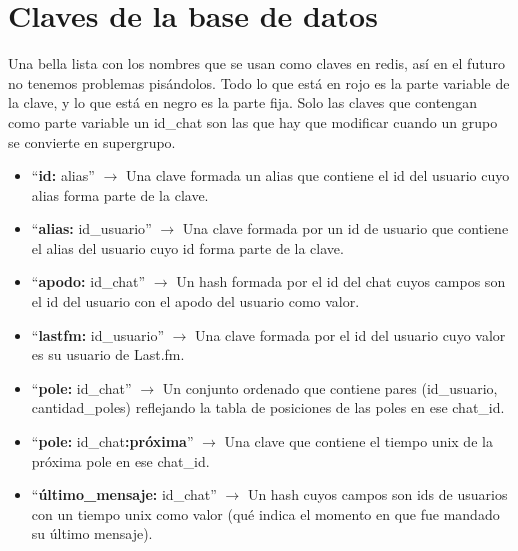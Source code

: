 \section{Claves de la base de datos}

Una bella lista con los nombres que se usan como claves en redis, así en el futuro no tenemos problemas pisándolos. Todo lo que está en rojo es la parte variable de la clave, y lo que está en negro es la parte fija. Solo las claves que contengan como parte variable un id\_chat son las que hay que modificar cuando un grupo se convierte en supergrupo.

\begin{itemize}
	\item ``\textbf{id:}{\color{red} alias}'' $\rightarrow$ Una clave formada un alias que contiene el id del usuario cuyo alias forma parte de la clave.
	\item ``\textbf{alias:}{\color{red} id\_usuario}'' $\rightarrow$ Una clave formada por un id de usuario que contiene el alias del usuario cuyo id forma parte de la clave.
	\item ``\textbf{apodo:}{\color{red} id\_chat}'' $\rightarrow$ Un hash formada por el id del chat cuyos campos son el id del usuario con el apodo del usuario como valor.
	\item ``\textbf{lastfm:}{\color{red} id\_usuario}'' $\rightarrow$ Una clave formada por el id del usuario cuyo valor es su usuario de Last.fm.
	\item ``\textbf{pole:}{\color{red} id\_chat}'' $\rightarrow$ Un conjunto ordenado que contiene pares (id\_usuario, cantidad\_poles) reflejando la tabla de posiciones de las poles en ese chat\_id.
	\item ``\textbf{pole:}{\color{red} id\_chat}\textbf{:próxima}'' $\rightarrow$ Una clave que contiene el tiempo unix de la próxima pole en ese chat\_id.
	\item ``\textbf{último\_mensaje:}{\color{red} id\_chat}'' $\rightarrow$ Un hash cuyos campos son ids de usuarios con un tiempo unix como valor (qué indica el momento en que fue mandado su último mensaje).
\end{itemize}



